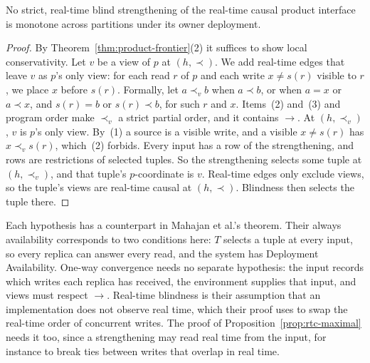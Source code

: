 \begin{proposition}
\label{prop:rtc-maximal}
No strict, real-time blind strengthening of the real-time causal product
interface is monotone across partitions under its owner deployment.
\end{proposition}

\begin{proof}
By Theorem~\ref{thm:product-frontier}(2) it suffices to show local
conservativity.  Let $v$ be a view of $p$ at $(h,\prec)$.  We add real-time
edges that leave $v$ as $p$'s only view: for each read $r$ of $p$ and each
write $x\ne s(r)$ visible to $r$, we place $x$ before $s(r)$.  Formally, let
$a\prec_v b$ when $a\prec b$, or when $a=x$ or $a\prec x$, and $s(r)=b$ or
$s(r)\prec b$, for such $r$ and $x$.  Items~(2) and~(3) and program order make
$\prec_v$ a strict partial order, and it contains $\to$.  At $(h,\prec_v)$,
$v$ is $p$'s only view.  By~(1) a source is a visible write, and a visible
$x\ne s(r)$ has $x\prec_v s(r)$, which~(2) forbids.  Every input has a row of
the strengthening, and rows are restrictions of selected tuples.  So the
strengthening selects some tuple at $(h,\prec_v)$, and that tuple's
$p$-coordinate is $v$.  Real-time edges only exclude views, so the tuple's
views are real-time causal at $(h,\prec)$.  Blindness then selects the tuple
there.
\end{proof}

Each hypothesis has a counterpart in Mahajan et al.'s theorem.  Their always
availability corresponds to two conditions here: $T$ selects a tuple at every
input, so every replica can answer every read, and the system has Deployment
Availability.  One-way convergence needs no separate hypothesis: the input
records which writes each replica has received, the environment supplies that
input, and views must respect $\to$.  Real-time blindness is their assumption
that an implementation does not observe real time, which their proof uses to
swap the real-time order of concurrent writes.  The proof of
Proposition~\ref{prop:rtc-maximal} needs it too, since a strengthening may read
real time from the input, for instance to break ties between writes that
overlap in real time.
